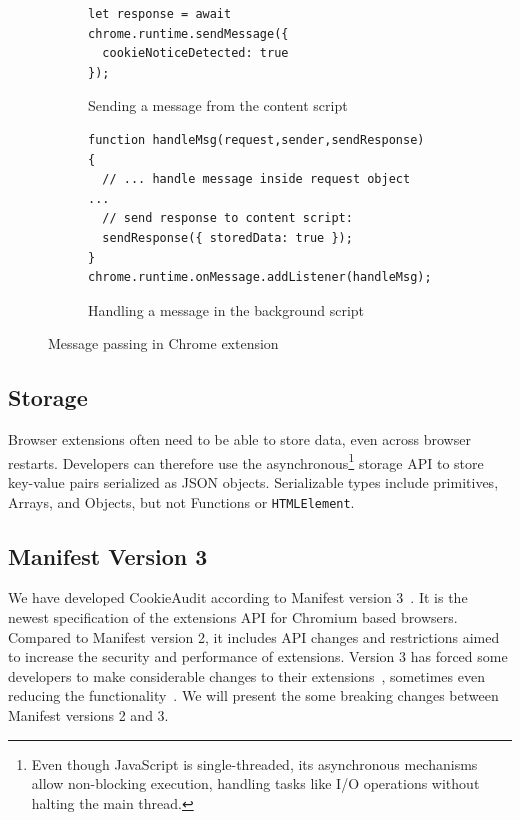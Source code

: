 \begin{figure}
	\centering
	    
	\begin{subfigure}{\textwidth}
		\centering
		\begin{lstlisting}
let response = await chrome.runtime.sendMessage({
  cookieNoticeDetected: true
});
		\end{lstlisting}
		\caption{Sending a message from the content script}
	\end{subfigure}
	    
	\begin{subfigure}{\textwidth}
		\centering
		\begin{lstlisting}
function handleMsg(request,sender,sendResponse) {
  // ... handle message inside request object ...
  // send response to content script:
  sendResponse({ storedData: true });
}
chrome.runtime.onMessage.addListener(handleMsg);
		\end{lstlisting}
		\caption{Handling a message in the background script}
	\end{subfigure}
	    
	\caption{Message passing in Chrome extension}
	\label{fig:message-passing}
\end{figure}

\subsection{Storage} \label{subsec:storage}
Browser extensions often need to be able to store data, even across browser restarts.
Developers can therefore use the asynchronous\footnote{Even though JavaScript is single-threaded, its asynchronous mechanisms allow non-blocking execution, handling tasks like I/O operations without halting the main thread.} storage API to store key-value pairs serialized as JSON objects. Serializable types include primitives, Arrays, and Objects, but not Functions or \verb|HTMLElement|.

\subsection{Manifest Version 3} \label{subsec:manifest-v3}
We have developed CookieAudit according to Manifest version 3~\cite{manifestv3}.
It is the newest specification of the extensions API for Chromium based browsers.
Compared to Manifest version 2, it includes API changes and restrictions aimed to increase the security and performance of extensions.
Version 3 has forced some developers to make considerable changes to their extensions~\cite{purdy2024chrome, huczynski2018ublock}, sometimes even reducing the functionality~\cite{hill2024google}.
We will present the some breaking changes between Manifest versions 2 and 3.

